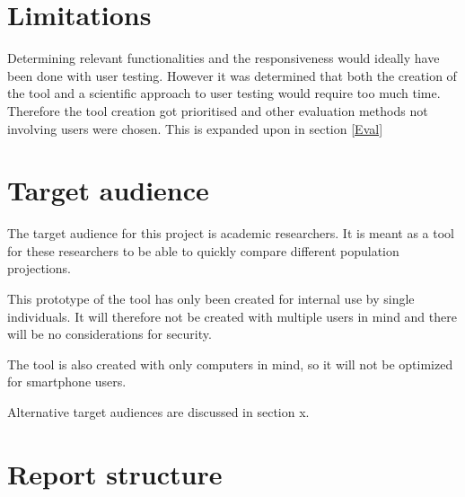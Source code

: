 \section{Limitations}\label{Lim}

Determining relevant functionalities and the responsiveness would ideally have been done with user testing.  However it was determined that both the creation of the tool and a scientific approach to user testing would require too much time.
Therefore the tool creation got prioritised and other evaluation methods not involving users were chosen. This is expanded upon in section \ref{Eval}

\section{Target audience}\label{TA}

The target audience for this project is academic researchers. It is meant as a tool for these researchers to be able to quickly compare different population projections. 

This prototype of the tool has only been created for internal use by single individuals. It will therefore not be created with multiple users in mind and there will be no considerations for security.


The tool is also created with only computers in mind, so it will not be optimized for smartphone users. 

Alternative target audiences are discussed in section x.

\section{Report structure}


%
%

